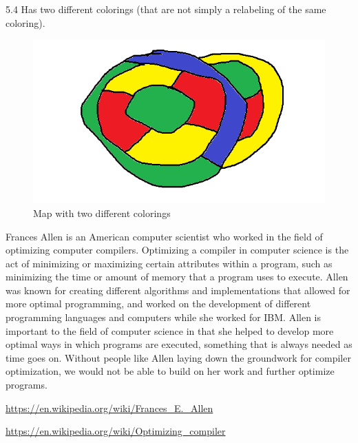 \documentclass{article}
\begin{document}
\clearpage
\header
\item[]5.4 Has two different colorings (that are not simply a relabeling of the same coloring).
\begin{figure}[h!]
  \includegraphics[width=\linewidth]{Untitled3.png}
  \caption{Map with two different colorings}
  \label{fig:map1}
\end{figure}

\clearpage
\header
\item[] Frances Allen is an American computer scientist who worked in the field of optimizing computer compilers. Optimizing a compiler in computer science is the act of minimizing or maximizing certain attributes within a program, such as minimizing the time or amount of memory that a program uses to execute. Allen was known for creating different algorithms and implementations that allowed for more optimal programming, and worked on the development of different programming languages and computers while she worked for IBM. Allen is important to the field of computer science in that she helped to develop more optimal ways in which programs are executed, something that is always needed as time goes on. Without people like Allen laying down the groundwork for compiler optimization, we would not be able to build on her work and further optimize programs.

\item[]\url{https://en.wikipedia.org/wiki/Frances_E._Allen}
\item[]\url{https://en.wikipedia.org/wiki/Optimizing_compiler}
\end{document}

